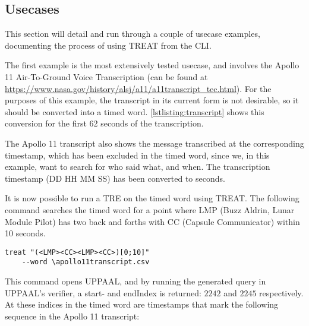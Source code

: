 \subsection{Usecases}\label{subsec:usecases}


This section will detail and run through a couple of usecase examples, documenting the process of using TREAT from the CLI.

The first example is the most extensively tested usecase, and involves the Apollo 11 Air-To-Ground Voice Transcription (can be found at \url{https://www.nasa.gov/history/alsj/a11/a11transcript_tec.html}). For the purposes of this example, the transcript in its current form is not desirable, so it should be converted into a timed word. \cref{lstlisting:transcript} shows this conversion for the first 62 seconds of the transcription.



The Apollo 11 transcript also shows the message transcribed at the corresponding timestamp, which has been excluded in the timed word, since we, in this example, want to search for who said what, and when. The transcription timestamp (DD HH MM SS) has been converted to seconds.

It is now possible to run a TRE on the timed word using TREAT. The following command searches the timed word for a point where LMP (Buzz Aldrin, Lunar Module Pilot) has two back and forths with CC (Capsule Communicator) within 10 seconds.

\begin{minipage}{\columnwidth}
    \begin{lstlisting}[basicstyle=\scriptsize\ttfamily]
    treat "(<LMP><CC><LMP><CC>)[0;10]"
    --word \apollo11transcript.csv
            \end{lstlisting}
\end{minipage}
\vspace{-1em}
\label{lstlisting:lmpcctre}
\vspace{1em}

This command opens UPPAAL, and by running the generated query in UPPAAL's verifier, a start- and endIndex is returned: $2242$ and $2245$ respectively. At these indices in the timed word are timestamps that mark the following sequence in the Apollo 11 transcript:

